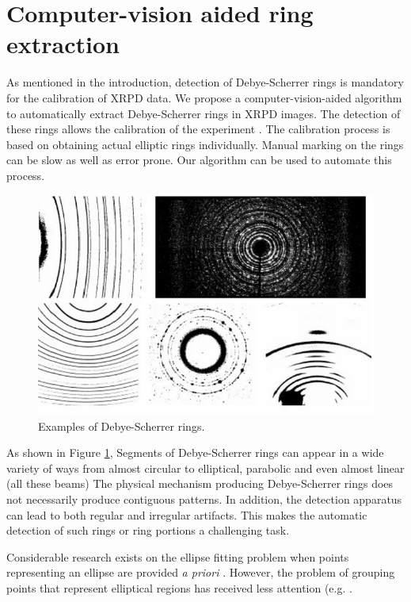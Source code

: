 \documentclass[preprint]{iucr}              %
\newcommand\dsrs{Debye-Scherrer rings}
\begin{document}
\section{Computer-vision aided ring extraction}
As mentioned in the introduction, detection of {\dsrs} is mandatory for the calibration of XRPD data. We propose a computer-vision-aided algorithm to automatically extract {\dsrs} in XRPD images. The detection of these rings allows the calibration of the experiment \cite{pyFAI_2015}. The calibration process is based on obtaining actual elliptic rings individually. Manual marking on the rings can be slow as well as error prone. Our algorithm can be used to automate this process.


\begin{figure}
\centering

\includegraphics[width=.85\linewidth]{Figures/dsrs_example.png}

\label{fig:examples}
\caption{
Examples of \dsrs{}.}
\end{figure}

As shown in Figure \ref{fig:examples}, Segments of Debye-Scherrer rings can appear in a wide variety of ways from almost circular to elliptical, parabolic and even almost linear (all these beams) The physical mechanism producing {\dsrs} does not necessarily produce contiguous patterns. In addition, the detection apparatus can lead to both regular and irregular artifacts. This makes the automatic detection of such rings or ring portions a challenging task.

Considerable research exists on the ellipse fitting problem when points representing an ellipse are provided \textit{a priori} \cite{gander1996least,fitzgibbon1999direct,kanatani2008compact}. However, the problem of grouping points that represent elliptical regions has received less attention (e.g.  \cite{qiao2007arc,chia2011split,wong2012survey,puatruaucean12A}. 
\end{document}

